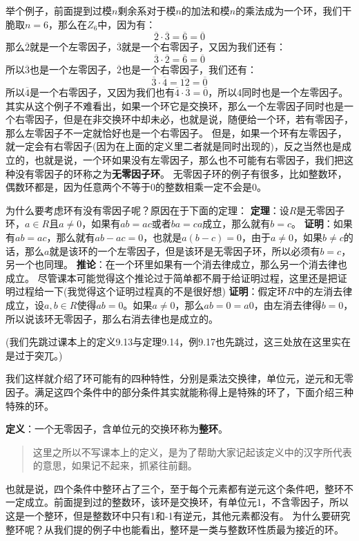 \documentclass[12pt, a4paper, oneside]{ctexart}
\newenvironment{myquote}{\begin{quote}\small\color{gray}}{\end{quote}}
\begin{document}
举个例子，前面提到过模$n$剩余系对于模$n$的加法和模$n$的乘法成为一个环，我们干脆取$n=6$，那么在$Z_6$中，因为有：
\[
\overline{2}\cdot\overline{3}=\overline{6}=\overline{0}
\]
那么$\overline{2}$就是一个左零因子，$\overline{3}$就是一个右零因子，又因为我们还有：
\[
\overline{3}\cdot\overline{2}=\overline{6}=\overline{0}
\]
所以$\overline{3}$也是一个左零因子，$\overline{2}$也是一个右零因子，我们还有：
\[
\overline{3}\cdot\overline{4}=\overline{12}=\overline{0}
\]
所以$\overline{4}$是一个右零因子，又因为我们也有$\overline{4}\cdot\overline{3}=\overline{0}$，所以4同时也是一个左零因子。其实从这个例子不难看出，如果一个环它是交换环，那么一个左零因子同时也是一个右零因子，但是在非交换环中却未必，也就是说，随便给一个环，若有零因子，那么左零因子不一定就恰好也是一个右零因子。
但是，如果一个环有左零因子，就一定会有右零因子(因为在上面的定义里二者就是同时出现的)，反之当然也是成立的，也就是说，一个环如果没有左零因子，那么也不可能有右零因子，我们把这种没有零因子的环称之为\textbf{无零因子环}。
无零因子环的例子有很多，比如整数环，偶数环都是，因为任意两个不等于0的整数相乘一定不会是0。

为什么要考虑环有没有零因子呢？原因在于下面的定理：
\textbf{定理}：设$R$是无零因子环，$a\in R$且$a\neq 0$，如果有$ab=ac$或者$ba=ca$成立，那么就有$b=c$。
\textbf{证明}：如果有$ab=ac$，那么就有$ab-ac=0$，也就是$a(b-c)=0$，由于$a\neq 0$，如果$b\neq c$的话，那么$a$就是该环的一个左零因子，但是该环是无零因子环，所以必须有$b=c$，另一个也同理。
\textbf{推论}：在一个环里如果有一个消去律成立，那么另一个消去律也成立。
尽管课本可能觉得这个推论过于简单都不屑于给证明过程，这里还是把证明过程给一下(我觉得这个证明过程真的不是很好想)
\textbf{证明}：假定环$R$中的左消去律成立，设$a,b\in R$使得$ab=0$。如果$a\neq 0$，那么$ab=0=a0$，由左消去律得$b=0$，所以说该环无零因子，那么右消去律也是成立的。

(我们先跳过课本上的定义9.13与定理9.14，例9.17也先跳过，这三处放在这里实在是过于突兀。)

我们这样就介绍了环可能有的四种特性，分别是乘法交换律，单位元，逆元和无零因子。满足这四个条件中的部分条件其实就能称得上是特殊的环了，下面介绍三种特殊的环。

\textbf{定义}：一个无零因子，含单位元的交换环称为\textbf{整环}。

\begin{myquote}
这里之所以不写课本上的定义，是为了帮助大家记起该定义中的汉字所代表的意思，如果记不起来，抓紧往前翻。
\end{myquote}

也就是说，四个条件中整环占了三个，至于每个元素都有逆元这个条件吧，整环不一定成立。前面提到过的整数环，该环是交换环，有单位元1，不含零因子，所以这是一个整环，但是整数环中只有1和-1有逆元，其他元素都没有。
为什么要研究整环呢？从我们提的例子中也能看出，整环是一类与整数环性质最为接近的环。
\end{document}
